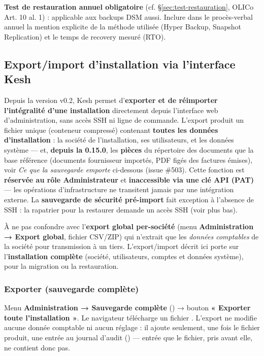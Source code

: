 \documentclass[a4paper,11pt,oneside]{article}
\begin{document}
\begin{keshwarning}
\textbf{Test de restauration annuel obligatoire} (cf. \S\ref{sec:test-restauration}, OLICo Art. 10 al. 1) : applicable aux backups DSM aussi. Inclure dans le procès-verbal annuel la mention explicite de la méthode utilisée (Hyper Backup, Snapshot Replication) et le temps de recovery mesuré (RTO).
\end{keshwarning}

\fussy
\subsection{Export/import d'installation via l'interface Kesh}\label{sec:backup-ui-keshbackup}

Depuis la version v0.2, Kesh permet d'\textbf{exporter et de réimporter l'intégralité d'une installation} directement depuis l'interface web d'administration, sans accès SSH ni ligne de commande. L'export produit un fichier unique  (conteneur compressé) contenant \textbf{toutes les données d'installation} : la société de l'installation, ses utilisateurs, et les données système --- et, \textbf{depuis la 0.15.0}, les \textbf{pièces} du répertoire des documents que la base référence (documents fournisseur importés, PDF figés des factures émises), voir \emph{Ce que la sauvegarde emporte} ci-dessous (issue \#503). Cette fonction est \textbf{réservée au rôle Administrateur} et \textbf{inaccessible via une clé API (PAT)} — les opérations d'infrastructure ne transitent jamais par une intégration externe. La \textbf{sauvegarde de sécurité pré-import} fait exception à l'absence de SSH : la rapatrier pour la restaurer demande un accès SSH (voir plus bas).

\begin{keshnote}
À ne pas confondre avec l'\textbf{export global per-société} (menu \textbf{Administration → Export global}, fichier CSV/ZIP) qui n'extrait que les \emph{données comptables} de la société pour transmission à un tiers. L'export/import  décrit ici porte sur l'\textbf{installation complète} (société, utilisateurs, comptes et données système), pour la migration ou la restauration.
\end{keshnote}

\subsubsection{Exporter (sauvegarde complète)}

Menu \textbf{Administration → Sauvegarde complète} () → bouton \textbf{« Exporter toute l'installation »}. Le navigateur télécharge un fichier . L'export ne modifie aucune donnée comptable ni aucun réglage : il ajoute seulement, une fois le fichier produit, une entrée au journal d'audit () --- entrée que le fichier, pris avant elle, ne contient donc pas.
\end{document}
